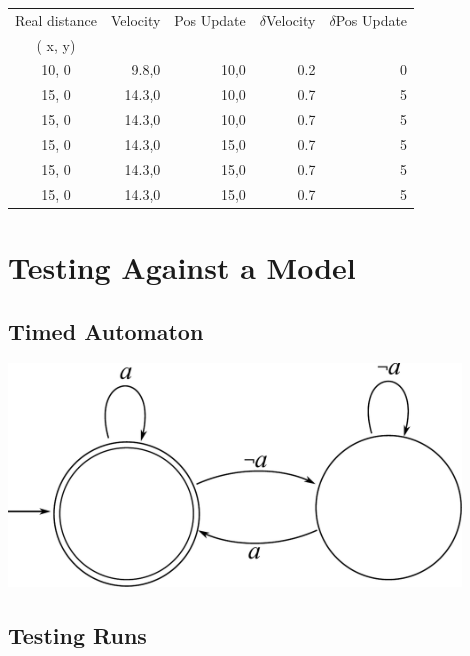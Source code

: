 \documentclass[12pt]{article}
\begin{document}
\begin{tabular}{ | c || r | r | r | r | }
\hline
Real distance & Velocity & Pos Update & $\delta$Velocity & $\delta$Pos Update \\
 ( x, y) & & & & \\ \hline
10, 0 & 9.8,0 & 10,0 & 0.2 & 0 \\ \hline
15, 0 & 14.3,0 & 10,0 & 0.7 & 5 \\ \hline
15, 0 & 14.3,0 & 10,0 & 0.7 & 5 \\ \hline
15, 0 & 14.3,0 & 15,0 & 0.7 & 5 \\ \hline
15, 0 & 14.3,0 & 15,0 & 0.7 & 5 \\ \hline
15, 0 & 14.3,0 & 15,0 & 0.7 & 5 \\ \hline
\end{tabular}

\section*{Testing Against a Model}

\subsection*{Timed Automaton}
\includegraphics[width = 0.9\textwidth]{images/timed_automaton_ref.pdf}

\subsection*{Testing Runs}
\end{document}
